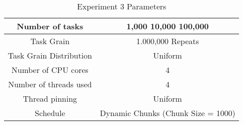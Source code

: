 \begin{table}
\centering
 \begin{tabular}{|c|c|}
  \hline
  Number of tasks & 1,000 10,000 100,000 \\
  \hline
  Task Grain & 1.000,000 Repeats \\
  \hline
  Task Grain Distribution & Uniform \\
  \hline
  Number of CPU cores & 4 \\
  \hline
  Number of threads used & 4 \\
  \hline
  Thread pinning & Uniform \\
  \hline
  Schedule & Dynamic Chunks (Chunk Size = 1000) \\
  \hline
 \end{tabular}
\caption{Experiment 3 Parameters}
\iflabelc
\label{table:evaluation_ex3_parameters}
\fi
{}
\end{table}

